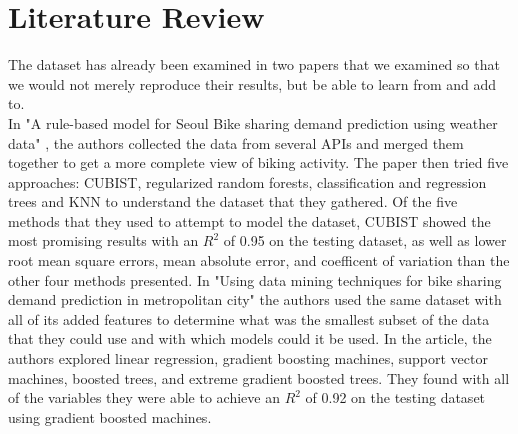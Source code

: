 \documentclass[main.tex]{subfiles}
\begin{document}
\section{Literature Review}
The dataset\cite{Irvine} has already been examined in two papers\cite{datamining}\cite{rulebased} that we examined so that we would not merely reproduce their results, but be able to learn from and add to.\\
In "A rule-based model for Seoul Bike sharing demand prediction using weather data" \cite{rulebased}, the authors collected the data from several APIs and merged them together to get a more complete view of biking activity. The paper then tried five approaches: CUBIST, regularized random forests, classification and regression trees and KNN to understand the dataset that they gathered. Of the five methods that they used to attempt to model the dataset, CUBIST showed the most promising results with an $R^2$ of 0.95 on the testing dataset, as well as lower root mean square errors, mean absolute error, and coefficent of variation than the other four methods presented.
In "Using data mining techniques for bike sharing demand prediction in metropolitan city" \cite{datamining} the authors used the same dataset with all of its added features to determine what was the smallest subset of the data that they could use and with which models could it be used. In the article, the authors explored linear regression, gradient boosting machines, support vector machines, boosted trees, and extreme gradient boosted trees. They found with all of the variables they were able to achieve an $R^2$ of 0.92 on the testing dataset using gradient boosted machines.
\end{document}
